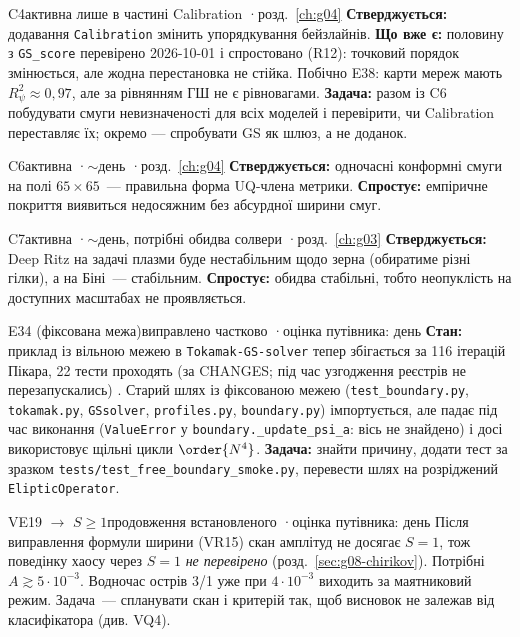 \begin{itemcard}{C4}{активна лише в частині Calibration \quad·\quad розд.~\ref{ch:g04}}
\textbf{Стверджується:} додавання \texttt{Calibration} змінить упорядкування бейзлайнів.
\textbf{Що вже є:} половину з \texttt{GS\_score} перевірено 2026-10-01 і спростовано (R12): точковий
порядок змінюється, але жодна перестановка не стійка. Побічно E38: карти мереж мають $R^2_\psi\approx0{,}97$,
але за рівнянням ГШ не є рівновагами. \textbf{Задача:} разом із C6 побудувати смуги невизначеності
для всіх моделей і перевірити, чи Calibration переставляє їх; окремо --- спробувати GS як шлюз, а не доданок.
\end{itemcard}

\begin{itemcard}{C6}{активна \quad·\quad $\sim$день \quad·\quad розд.~\ref{ch:g04}}
\textbf{Стверджується:} одночасні конформні смуги на полі $65\times65$~--- правильна форма
UQ-члена метрики. \textbf{Спростує:} емпіричне покриття виявиться недосяжним без абсурдної
ширини смуг.
\end{itemcard}

\begin{itemcard}{C7}{активна \quad·\quad $\sim$день, потрібні обидва солвери \quad·\quad розд.~\ref{ch:g03}}
\textbf{Стверджується:} Deep Ritz на задачі плазми буде нестабільним щодо зерна (обиратиме різні
гілки), а на Біні~--- стабільним. \textbf{Спростує:} обидва стабільні, тобто неопуклість на
доступних масштабах не проявляється.
\end{itemcard}

\begin{itemcard}{E34 (фіксована межа)}{виправлено частково \quad·\quad оцінка путівника: день}
\textbf{Стан:} приклад із вільною межею в \texttt{Tokamak-GS-solver} тепер збігається за 116
ітерацій Пікара, 22 тести проходять (за CHANGES; під час узгодження реєстрів не перезапускались)
\cite{g04GSsolverChanges}. Старий шлях із фіксованою межею (\texttt{test\_boundary.py},
\texttt{tokamak.py}, \texttt{GSsolver}, \texttt{profiles.py}, \texttt{boundary.py}) імпортується,
але падає під час виконання (\texttt{ValueError} у \texttt{boundary.\_update\_psi\_a}: вісь не
знайдено) і досі використовує щільні цикли $\order{N^4}$. \textbf{Задача:} знайти причину, додати
тест за зразком \texttt{tests/test\_free\_boundary\_smoke.py}, перевести шлях на розріджений
\texttt{ElipticOperator}.
\end{itemcard}

\begin{itemcard}{VE19 $\to$ $S\ge1$}{продовження встановленого \quad·\quad оцінка путівника: день}
Після виправлення формули ширини (VR15) скан амплітуд не досягає $S=1$, тож поведінку хаосу
через $S=1$ \emph{не перевірено} (розд.~\ref{sec:g08-chirikov}). Потрібні $A\gtrsim5\cdot10^{-3}$.
Водночас острів 3/1 уже при $4\cdot10^{-3}$ виходить за маятниковий режим. Задача~--- спланувати
скан і критерій так, щоб висновок не залежав від класифікатора (див. VQ4).
\end{itemcard}

